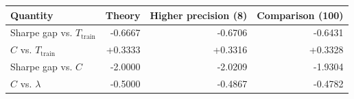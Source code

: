 \begin{tabular}{lrrr}
\toprule
Quantity & Theory & Higher precision (8) & Comparison (100) \\
\midrule
Sharpe gap vs. $T_{\mathrm{train}}$ & -0.6667 & -0.6706 & -0.6431 \\
$C$ vs. $T_{\mathrm{train}}$ & +0.3333 & +0.3316 & +0.3328 \\
Sharpe gap vs. $C$ & -2.0000 & -2.0209 & -1.9304 \\
$C$ vs. $\lambda$ & -0.5000 & -0.4867 & -0.4782 \\
\bottomrule
\end{tabular}
